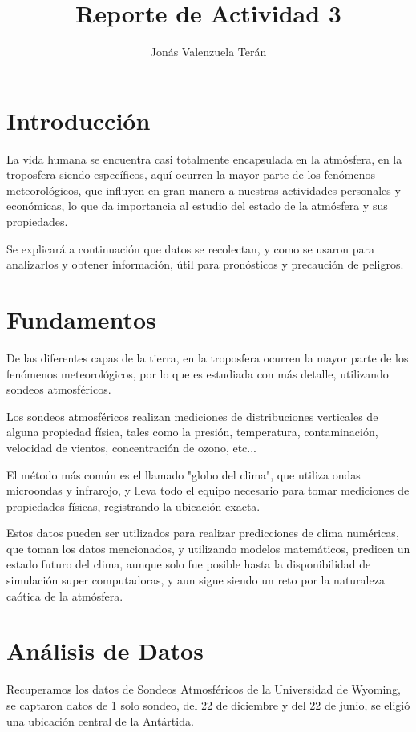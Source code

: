 \documentclass[a4paper]{article}
\title{Reporte de Actividad 3}
\author{Jonás Valenzuela Terán}
\begin{document}
\maketitle


\section*{Introducción}

La vida humana se encuentra casi totalmente encapsulada en la atmósfera, en la troposfera siendo específicos, aquí ocurren la mayor parte de los fenómenos meteorológicos, que influyen en gran manera a nuestras actividades personales y económicas, lo que da importancia al estudio del estado de la atmósfera y sus propiedades.

Se explicará a continuación que datos se recolectan, y como se usaron para analizarlos y obtener información, útil para pronósticos y precaución de peligros.

\section*{Fundamentos}

De las diferentes capas de la tierra, en la troposfera ocurren la mayor parte de los fenómenos meteorológicos, por lo que es estudiada con más detalle, utilizando sondeos atmosféricos.

Los sondeos atmosféricos realizan mediciones de distribuciones verticales de alguna propiedad física, tales como la presión, temperatura, contaminación, velocidad de vientos, concentración de ozono, etc...

El método más común es el llamado "globo del clima", que utiliza ondas microondas y infrarojo, y lleva todo el equipo necesario para tomar mediciones de propiedades físicas, registrando la ubicación exacta.

Estos datos pueden ser utilizados para realizar predicciones de clima numéricas, que toman los datos mencionados, y utilizando modelos matemáticos, predicen un estado futuro del clima, aunque solo fue posible hasta la disponibilidad de simulación super computadoras, y aun sigue siendo un reto por la naturaleza caótica de la atmósfera.



\section*{Análisis de Datos}

Recuperamos los datos de Sondeos Atmosféricos de la Universidad de Wyoming, se captaron datos de 1 solo sondeo, del 22 de diciembre y del 22 de junio, se eligió una ubicación central de la Antártida.
\end{document}
